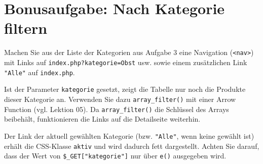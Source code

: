 \documentclass[a4paper,12pt]{article}
\begin{document}
\section{Bonusaufgabe: Nach Kategorie filtern}

Machen Sie aus der Liste der Kategorien aus Aufgabe 3 eine Navigation (\texttt{<nav>}) mit Links auf \texttt{index.php?kategorie=Obst} usw. sowie einem zusätzlichen Link \texttt{"{}Alle"{}} auf \texttt{index.php}.

Ist der Parameter \texttt{kategorie} gesetzt, zeigt die Tabelle nur noch die Produkte dieser Kategorie an. Verwenden Sie dazu \texttt{array\_filter()} mit einer Arrow Function (vgl. Lektion 05). Da \texttt{array\_filter()} die Schlüssel des Arrays beibehält, funktionieren die Links auf die Detailseite weiterhin.

Der Link der aktuell gewählten Kategorie (bzw. \texttt{"{}Alle"{}}, wenn keine gewählt ist) erhält die CSS-Klasse \texttt{aktiv} und wird dadurch fett dargestellt. Achten Sie darauf, dass der Wert von \texttt{\$\_GET["{}kategorie"{}]} nur über \texttt{e()} ausgegeben wird.
\end{document}
